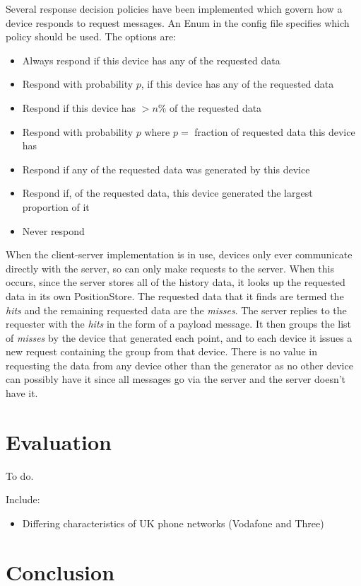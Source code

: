 Several response decision policies have been implemented which govern how a device responds to request messages. An Enum in the config file specifies which policy should be used. The options are:
\begin{itemize}
\item{Always respond if this device has any of the requested data}
\item{Respond with probability $p$, if this device has any of the requested data}
\item{Respond if this device has $>n \% $ of the requested data}
\item{Respond with probability $p$ where $p=$ fraction of requested data this device has}
\item{Respond if any of the requested data was generated by this device}
\item{Respond if, of the requested data, this device generated the largest proportion of it}
\item{Never respond}
\end{itemize}

When the client-server implementation is in use, devices only ever communicate directly with the server, so can only make requests to the server. When this occurs, since the server stores all of the history data, it looks up the requested data in its own PositionStore. The requested data that it finds are termed the \emph{hits} and the remaining requested data are the \emph{misses}. The server replies to the requester with the \emph{hits} in the form of a payload message. It then groups the list of \emph{misses} by the device that generated each point, and to each device it issues a new request containing the group from that device. There is no value in requesting the data from any device other than the generator as no other device can possibly have it since all messages go via the server and the server doesn't have it.

\cleardoublepage
\chapter{Evaluation}

To do.

Include:
\begin{itemize}
\item{Differing characteristics of UK phone networks (Vodafone and Three)}
\end{itemize}

\cleardoublepage
\chapter{Conclusion}

